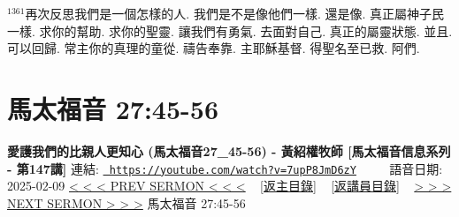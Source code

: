 \documentclass{book}
\begin{document}
$^{1361}$再次反思我們是一個怎樣的人.
我們是不是像他們一樣.
還是像.
真正屬神子民一樣.
求你的幫助.
求你的聖靈.
讓我們有勇氣.
去面對自己.
真正的屬靈狀態.
並且.
可以回歸.
常主你的真理的童從.
禱告奉靠.
主耶穌基督.
得聖名至已救.
阿們.
\newpage



\section{馬太福音 27:45-56}
\label{sec:7upP8JmD6zY}
\textbf{愛護我們的比親人更知心 (馬太福音27\_45-56) - 黃紹權牧師  [馬太福音信息系列 - 第147講]}
\newline
\newline
連結: \href{https://youtube.com/watch?v=7upP8JmD6zY}{\texttt{ https://youtube.com/watch?v=7upP8JmD6zY}} ~~~~ 語音日期: 2025-02-09 
\newline
\newline
\hyperref[sec:oCpi7n8ictU]{< < < PREV SERMON < < <}
~
\hyperlink{toc}{[返主目錄]}
~
\hyperref[ch:preacher15]{[返講員目錄]}
~
\hyperref[sec:MfR5_HAo14I]{> > > NEXT SERMON > > >}
\newline
\newline
馬太福音 27:45-56
\newline
\end{document}
